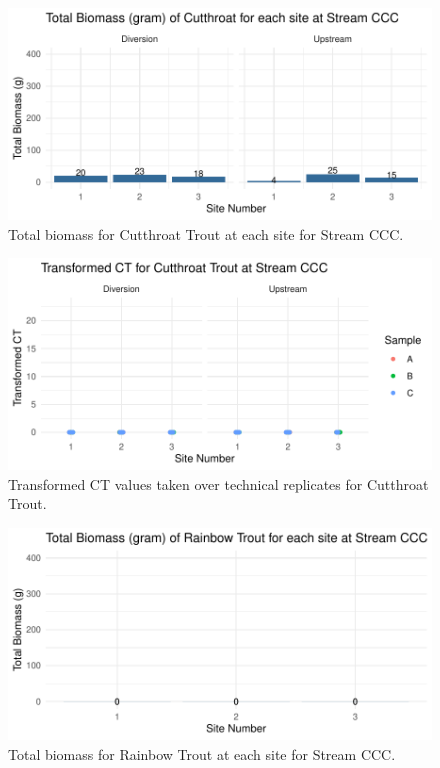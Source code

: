 \begin{figure}[H]
\centering
\includegraphics{AppendixImages/CCC_Ct_new.pdf}
\caption{  \hspace{1mm}   Total biomass for Cutthroat Trout at each site for Stream CCC.}
\label{fig:testCCCbiomCt}
\end{figure}





\begin{figure}[H]
\centering
\includegraphics{AppendixImages/CCC_ct_tct.pdf}
\caption{ \hspace{1mm}    Transformed CT values taken over technical replicates for Cutthroat Trout.}
\label{fig:CCC_ct}
\end{figure}




\begin{figure}[H]
\centering
\includegraphics{AppendixImages/CCC_Rb_new.pdf}
\caption{  \hspace{1mm}   Total biomass for Rainbow Trout at each site for Stream CCC.}
\label{fig:testCCCbiomRb}
\end{figure}





